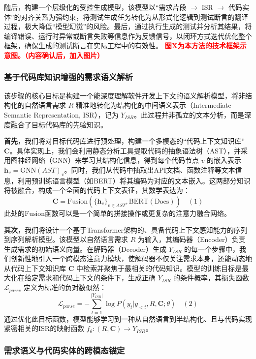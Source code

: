 \documentclass[12pt]{article}
\begin{document}
随后，构建一个层级化的受控生成模型，该模型以“需求片段 $\rightarrow$ ISR $\rightarrow$ 代码实体”的对齐关系为强约束，将测试生成任务转化为从形式化逻辑到测试断言的翻译过程，极大降低“模型幻觉”的风险。最后，通过执行生成的测试并分析其结果，将编译错误、运行时异常或断言失败等信息作为反馈信号，以闭环方式迭代优化整个框架，确保生成的测试断言在实际工程中的有效性。
\textcolor{red}{\textbf{图X为本方法的技术框架示意图。（内容确认后，加入图片）}}



\subsubsection{基于代码库知识增强的需求语义解析}

该步骤的核心目标是构建一个能深度理解软件开发上下文的语义解析模型，将非结构化的自然语言需求 $R$ 精准地转化为结构化的中间语义表示（Intermediate Semantic Representation, ISR），记为 $Y_{ISR}$。此过程并非孤立的文本分析，而是深度融合了目标代码库的先验知识。

\textbf{首先}，我们将对目标代码库进行预处理，构建一个多模态的“代码上下文知识库” $\mathbf{C}$。具体实现上，我们会利用静态分析工具提取代码的抽象语法树（AST），并采用图神经网络（GNN）来学习其结构化信息，得到每个代码节点 $v$ 的嵌入表示 $\mathbf{h}_v = \text{GNN}(AST)_v$。同时，我们从代码中抽取出API文档、函数注释等文本信息，利用预训练语言模型（如BERT）将其编码为对应的文本嵌入。这两部分知识将被融合，构成一个全面的代码上下文表征，其数学表达为：
$$
\mathbf{C} = \text{Fusion}(\{\mathbf{h}_v\}_{v \in AST}, \text{BERT}(\text{Docs})) \quad (1)
$$
此处的$\text{Fusion}$函数可以是一个简单的拼接操作或更复杂的注意力融合网络。

\textbf{其次}，我们将设计一个基于Transformer架构的、具备代码上下文感知能力的序列到序列解析模型。该模型以自然语言需求 $R$ 为输入，其编码器（Encoder）负责生成需求的初始语义向量。在解码器（Decoder）生成 $Y_{ISR}$ 的每一个步骤中，我们创新性地引入一个跨模态注意力模块，使解码器不仅关注需求本身，还能动态地从代码上下文知识库 $\mathbf{C}$ 中检索并聚焦于最相关的代码知识。模型的训练目标是最大化在给定需求和代码上下文的条件下，生成正确 $Y_{ISR}$ 的条件概率，其损失函数 $\mathcal{L}_{parse}$ 定义为标准的负对数似然：
$$
\mathcal{L}_{parse} = - \sum_{t=1}^{|Y_{ISR}|} \log P(y_t | y_{<t}, R, \mathbf{C}; \theta) \quad (2)
$$
通过优化此目标函数，模型能够学习到一种从自然语言到半结构化、且与代码实现紧密相关的ISR的映射函数 $f_{\theta}: (R, \mathbf{C}) \rightarrow Y_{ISR}$。

\subsubsection{需求语义与代码实体的跨模态锚定}
\end{document}
